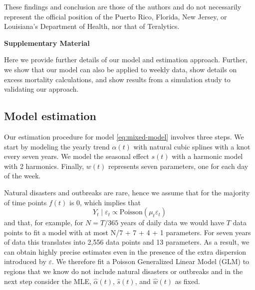 \documentclass[11pt]{article}
\begin{document}
These findings and conclusion are those of the authors and do not necessarily represent the official position of the Puerto Rico, Florida, New Jersey, or Louisiana's Department of Health, nor that of Teralytics. 

\newpage



\newpage
\begin{center}
\LARGE{\textbf{Supplementary Material}}
\end{center}

Here we provide further details of our model and estimation approach. Further, we show that our model can also be applied to weekly data, show details on excess mortality calculations, and show results from a simulation study to validating our approach. 

\subsection{Model estimation}
Our estimation procedure for model \ref{eq:mixed-model} involves three steps. We start by modeling the yearly trend $\alpha(t)$ with natural cubic splines with a knot every seven years. We model the seasonal effect $s(t)$ with a harmonic model with 2 harmonics. Finally, $w(t)$ represents seven parameters, one for each day of the week. 

Natural disasters and outbreaks are rare, hence we assume that for the majority of time points $f(t)$ is 0, which implies that 
\begin{equation*}
    Y_t \mid \varepsilon_t \propto \mbox{Poisson}(\mu_t  \varepsilon_t )
\end{equation*}
and that, for example, for $N = T / 365$ years of daily data we would have $T$ data points to fit a model with at most N/7 + 7 + 4 + 1 parameters. For seven years of data this translates into 2,556 data points and 13 parameters. As a result, we can obtain highly precise estimates even in the presence of the extra dispersion introduced by $\varepsilon$. We therefore fit a Poisson Generalized Linear Model (GLM) to regions that we know do not include natural disasters or outbreaks and in the next step consider the MLE, $\hat{\alpha}(t)$, $\hat{s}(t)$, and $\hat{w}(t)$ as fixed.
\end{document}
